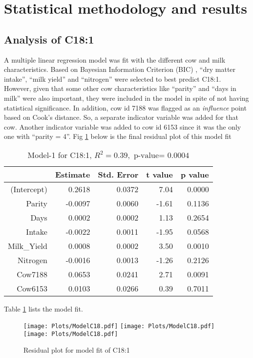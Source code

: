 \section*{Statistical methodology and results} \label{Sec_Methods}

\subsection*{Analysis of C18:1}
A multiple linear regression model was fit with the different cow and milk characteristics. Based on Bayesian Information Criterion (BIC) \cite{Schwarz_etal_1978_BIC}, ``dry matter intake'', ``milk yield'' and ``nitrogen'' were selected to best predict C18:1. However, given that some other cow characteristics like ``parity'' and ``days in milk'' were also important, they were included in the model in spite of not having statistical significance. In addition, cow id 7188 was flagged as an {\emph{influence}} point \cite{Chatterjee_Hadi_1986_SS} based on Cook's distance. So, a separate indicator variable was added for that cow. Another indicator variable was added to cow id 6153 since it was the only one with ``parity = 4''. Fig \ref{fig:Model18} below is the final residual plot of this model fit
\begin{table}[H]
\centering
\begin{tabular}{rrrrr}
  \hline
 & Estimate & Std. Error & t value & p value \\ 
  \hline
(Intercept) & 0.2618 & 0.0372 & 7.04 & 0.0000 \\ 
  Parity & -0.0097 & 0.0060 & -1.61 & 0.1136 \\ 
  Days & 0.0002 & 0.0002 & 1.13 & 0.2654 \\ 
  Intake & -0.0022 & 0.0011 & -1.95 & 0.0568 \\ 
  Milk\_Yield & 0.0008 & 0.0002 & 3.50 & 0.0010 \\ 
  Nitrogen & -0.0016 & 0.0013 & -1.26 & 0.2126 \\ 
  Cow7188 & 0.0653 & 0.0241 & 2.71 & 0.0091 \\ 
  Cow6153 & 0.0103 & 0.0266 & 0.39 & 0.7011 \\ 
   \hline
\end{tabular}
\caption{Model-1 for C18:1, $R^2 = 0.39, \text{ p-value= } 0.0004$}
\label{Tab:Model18}
\end{table}
Table \ref{Tab:Model18} lists the model fit. 

\begin{figure}[H]
\begin{center}
\texttt{[image: Plots/ModelC18.pdf]}
\texttt{[image: Plots/ModelC18.pdf]}
\texttt{[image: Plots/ModelC18.pdf]}
\end{center}
\caption{Residual plot for model fit of C18:1}
\label{fig:Model18}
\end{figure}

